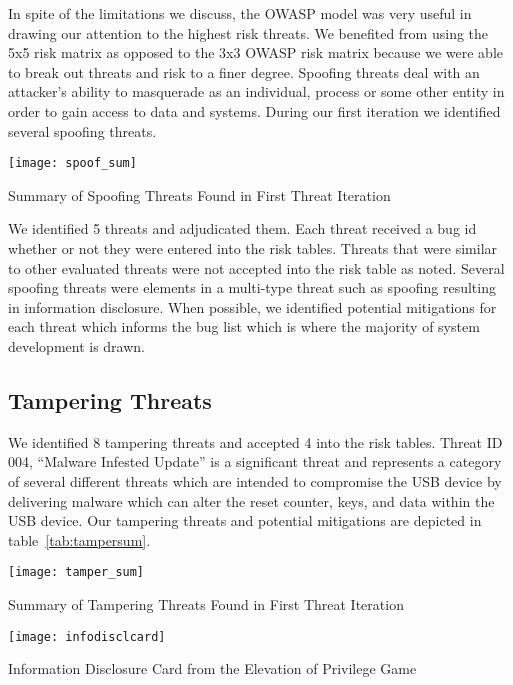 In spite of the limitations we discuss, the OWASP model was very useful in drawing our attention to the highest risk threats.  We benefited from using the 5x5 risk matrix as opposed to the 3x3 OWASP risk matrix because we were able to break out threats and risk to a finer degree. Spoofing threats deal with an attacker's ability to masquerade as an individual, process or some other entity in order to gain access to data and systems.  During our first iteration we identified several spoofing threats.

\begin{table*}[ht]
    \centering
    \texttt{[image: spoof\_sum]}
    \caption{Summary of Spoofing Threats Found in First Threat Iteration}
    \label{tab:spoofsum}
\end{table*}
We identified 5 threats and adjudicated them. Each threat received a bug id whether or not they were entered into the risk tables.  Threats that were similar to other evaluated threats were not accepted into the risk table as noted. Several spoofing threats were elements in a multi-type threat such as spoofing resulting in information disclosure. When possible, we identified potential mitigations for each threat which informs the bug list which is where the majority of system development is drawn.

\subsection{Tampering Threats}

We identified 8 tampering threats and accepted 4 into the risk tables.  Threat ID 004, ``Malware Infested Update'' is a significant threat and represents a category of several different threats which are intended to compromise the USB device by delivering malware which can alter the reset counter, keys, and data within the USB device.  Our tampering threats and potential mitigations are depicted in table~\ref{tab:tampersum}.

\begin{table*}[]
    \centering
    \texttt{[image: tamper\_sum]}
    \caption{Summary of Tampering Threats Found in First Threat Iteration}
    \label{tab:tampersum}
\end{table*}

\begin{marginfigure}[0.25in]%
\centering
  \texttt{[image: infodisclcard]}
  \caption{Information Disclosure Card from the Elevation of Privilege Game}
  \label{fig:spoofcard}
\end{marginfigure}

